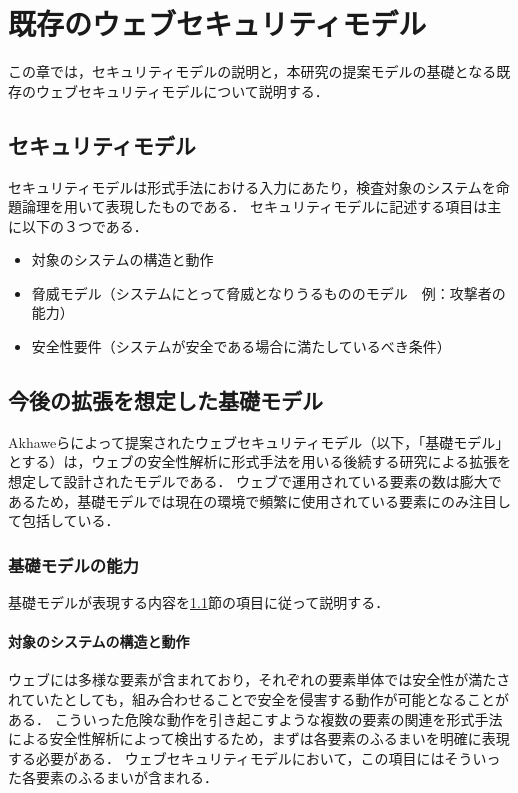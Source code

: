 \documentclass[12pt,a4paper]{jbook}
\begin{document}
\chapter{既存のウェブセキュリティモデル}
\label{sec:existing-model}
この章では，セキュリティモデルの説明と，本研究の提案モデルの基礎となる既存のウェブセキュリティモデルについて説明する．

\section{セキュリティモデル}
\label{sec:SecurityModel}
セキュリティモデルは形式手法における入力にあたり，検査対象のシステムを命題論理を用いて表現したものである．
セキュリティモデルに記述する項目は主に以下の３つである．
\begin{itemize}
\item 対象のシステムの構造と動作
\item 脅威モデル（システムにとって脅威となりうるもののモデル　例：攻撃者の能力）
\item 安全性要件（システムが安全である場合に満たしているべき条件）
\end{itemize}

\section{今後の拡張を想定した基礎モデル}
\label{sec:based-model}
Akhaweらによって提案されたウェブセキュリティモデル\cite{based-model}（以下，「基礎モデル」とする）は，ウェブの安全性解析に形式手法を用いる後続する研究による拡張を想定して設計されたモデルである．
ウェブで運用されている要素の数は膨大であるため，基礎モデルでは現在の環境で頻繁に使用されている要素にのみ注目して包括している．

\subsection{基礎モデルの能力}
\label{sec:based-model-power}
基礎モデルが表現する内容を\ref{sec:SecurityModel}節の項目に従って説明する．

\subsubsection{対象のシステムの構造と動作}
ウェブには多様な要素が含まれており，それぞれの要素単体では安全性が満たされていたとしても，組み合わせることで安全を侵害する動作が可能となることがある．
こういった危険な動作を引き起こすような複数の要素の関連を形式手法による安全性解析によって検出するため，まずは各要素のふるまいを明確に表現する必要がある．
ウェブセキュリティモデルにおいて，この項目にはそういった各要素のふるまいが含まれる．
\end{document}
